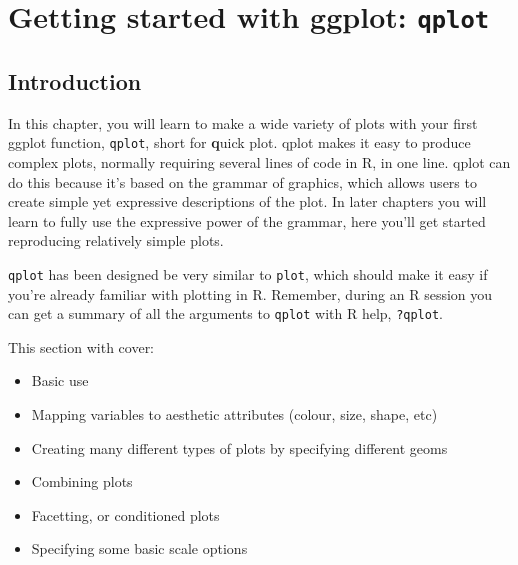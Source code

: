 


% 



\chapter{Getting started with ggplot: {\tt qplot}}

\section{Introduction} 

In this chapter, you will learn to make a wide variety of plots with your first ggplot function, {\tt qplot}, short for {\bf q}uick plot. qplot makes it easy to produce complex plots, normally requiring several lines of code in R, in one line. qplot can do this because it's based on the grammar of graphics, which allows users to create simple yet expressive descriptions of the plot.  In later chapters you will learn to fully use the expressive power of the grammar, here you'll get started reproducing relatively simple plots.

{\tt qplot} has been designed be very similar to {\tt plot}, which should make it easy if you're already familiar with plotting in R.  Remember, during an R session you can get a summary of all the arguments to {\tt qplot} with R help, {\tt ?qplot}.

This section with cover: 

\begin{itemize}
	\item Basic use
	\item Mapping variables to aesthetic attributes (colour, size, shape, etc)
	\item Creating many different types of plots by specifying different geoms
	\item Combining plots 
	\item Facetting, or conditioned plots
	\item Specifying some basic scale options
\end{itemize}

